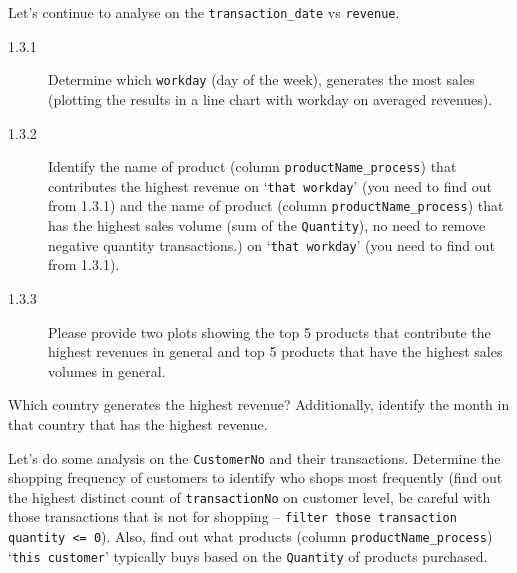 \documentclass[a4paper]{article}
\begin{document}
    \begin{answer}[Question 1.3]
    Let's continue to analyse on the \texttt{transaction_date} vs \texttt{revenue}. 
    \begin{description}
        \item[1.3.1] Determine which \texttt{workday} (day of the week),
  generates the most sales (plotting the results in a line chart with workday on averaged revenues).
        \item[1.3.2] Identify the name of product (column \texttt{productName_process}) that contributes the highest revenue on `\texttt{that workday}' (you need to find out from 1.3.1) and the name of product (column \texttt{productName_process}) that has the highest sales volume (sum of the \texttt{Quantity}), no need to remove negative quantity transactions.) on `\texttt{that workday}' (you need to find out from 1.3.1).
        \item[1.3.3] Please provide two plots showing the top 5 products that contribute the highest revenues in general and top 5 products that have the highest sales volumes in general.
    \end{description}
    
    \end{answer}
    
    \begin{answer}[Question 1.4]
    Which country generates the highest revenue? Additionally, identify the month in that country that has the highest revenue.
    \end{answer}
    
    \begin{answer}[Question 1.5]
    Let's do some analysis on the \texttt{CustomerNo} and their transactions.
    Determine the shopping frequency of customers to identify who shops most frequently (find out the highest distinct count of \texttt{transactionNo} on customer level, be careful with those transactions that is not for shopping -- \texttt{filter those transaction quantity <= 0}). Also, find out what products (column \texttt{productName_process}) `\texttt{this customer}' typically buys based on the \texttt{Quantity} of products purchased. 
    
    \end{answer}
    
\end{document}
